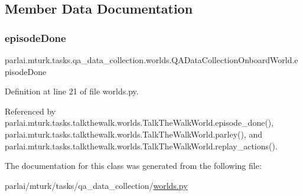 \subsection{Member Data Documentation}
\mbox{\label{classparlai_1_1mturk_1_1tasks_1_1qa__data__collection_1_1worlds_1_1QADataCollectionOnboardWorld_ac4db38f49dc8de63c95ca6049bf61ebb}} 
\subsubsection{\texorpdfstring{episode\+Done}{episodeDone}}
{\footnotesize\ttfamily parlai.\+mturk.\+tasks.\+qa\+\_\+data\+\_\+collection.\+worlds.\+Q\+A\+Data\+Collection\+Onboard\+World.\+episode\+Done}



Definition at line 21 of file worlds.\+py.



Referenced by parlai.\+mturk.\+tasks.\+talkthewalk.\+worlds.\+Talk\+The\+Walk\+World.\+episode\+\_\+done(), parlai.\+mturk.\+tasks.\+talkthewalk.\+worlds.\+Talk\+The\+Walk\+World.\+parley(), and parlai.\+mturk.\+tasks.\+talkthewalk.\+worlds.\+Talk\+The\+Walk\+World.\+replay\+\_\+actions().



The documentation for this class was generated from the following file\+:\begin{DoxyCompactItemize}
\item 
parlai/mturk/tasks/qa\+\_\+data\+\_\+collection/\hyperlink{parlai_2mturk_2tasks_2qa__data__collection_2worlds_8py}{worlds.\+py}\end{DoxyCompactItemize}
